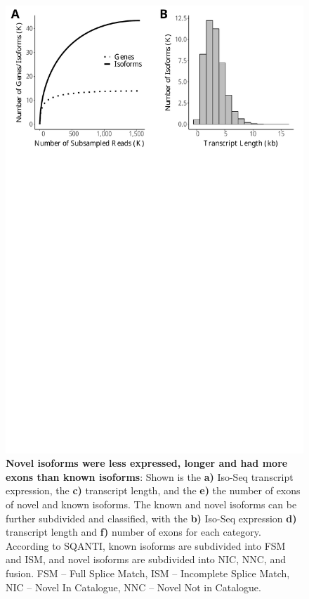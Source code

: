 \begin{figure}[htp]
	\begin{center}
		\includegraphics[page=7,scale = 0.55]{Figures/IsoSeqWholeTranscriptome.pdf}
	\end{center}
	\captionsetup{width=0.95\textwidth}
	\caption[Comparison of Known and Novel Isoforms from Iso-Seq Whole Transcriptome runs]%
	{\textbf{Novel isoforms were less expressed, longer and had more exons than known isoforms}: Shown is the \textbf{a)} Iso-Seq transcript expression, the \textbf{c)} transcript length, and the \textbf{e)} the number of exons of novel and known isoforms. The known and novel isoforms can be further subdivided and classified, with the \textbf{b)} Iso-Seq expression \textbf{d)} transcript length and \textbf{f)} number of exons for each category. According to SQANTI, known isoforms are subdivided into FSM and ISM, and novel isoforms are subdivided into NIC, NNC, and fusion. FSM – Full Splice Match, ISM – Incomplete Splice Match, NIC – Novel In Catalogue, NNC – Novel Not in Catalogue.}   
	\label{fig:isoseq_whole_novel_known_iso_corr}
\end{figure}


